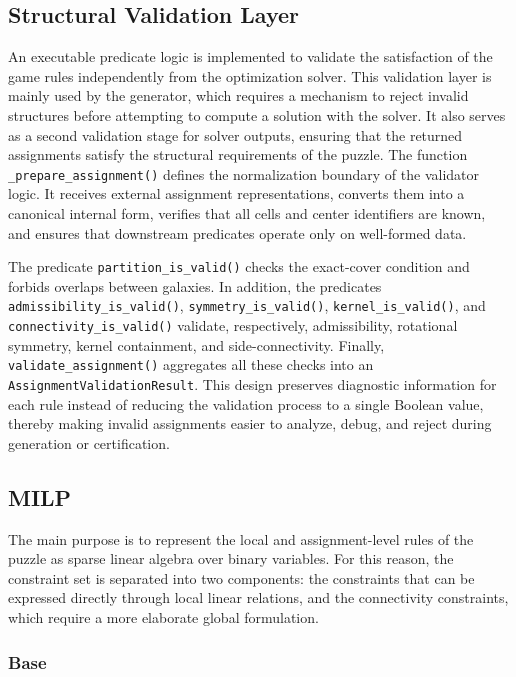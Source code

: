 \subsection{Structural Validation Layer}
An executable predicate logic is implemented to validate the satisfaction of the game rules independently from the optimization solver. This validation layer is mainly used by the generator, which requires a mechanism to reject invalid structures before attempting to compute a solution with the solver. It also serves as a second validation stage for solver outputs, ensuring that the returned assignments satisfy the structural requirements of the puzzle. The function \texttt{\_prepare\_assignment()} defines the normalization boundary of the validator logic. It receives external assignment representations, converts them into a canonical internal form, verifies that all cells and center identifiers are known, and ensures that downstream predicates operate only on well-formed data.

The predicate \texttt{partition\_is\_valid()} checks the exact-cover condition and forbids overlaps between galaxies. In addition, the predicates \texttt{admissibility\_is\_valid()}, \texttt{symmetry\_is\_valid()}, \texttt{kernel\_is\_valid()}, and \texttt{connectivity\_is\_valid()} validate, respectively, admissibility, rotational symmetry, kernel containment, and side-connectivity. Finally, \texttt{validate\_assignment()} aggregates all these checks into an \texttt{AssignmentValidationResult}. This design preserves diagnostic information for each rule instead of reducing the validation process to a single Boolean value, thereby making invalid assignments easier to analyze, debug, and reject during generation or certification.

\subsection{MILP}

The main purpose is to represent the local and assignment-level rules of the puzzle as sparse linear algebra over binary variables. For this reason, the constraint set is separated into two components: the constraints that can be expressed directly through local linear relations, and the connectivity constraints, which require a more elaborate global formulation.

\subsubsection{Base}

